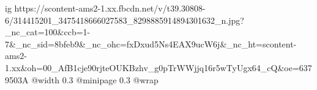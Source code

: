  
 
 
 
 

\ifcmt
  ig https://scontent-ams2-1.xx.fbcdn.net/v/t39.30808-6/314415201_3475418666027583_8298885914894301632_n.jpg?_nc_cat=100&ccb=1-7&_nc_sid=8bfeb9&_nc_ohc=fxDxud5Ns4EAX9ucW6j&_nc_ht=scontent-ams2-1.xx&oh=00_AfB1cje90rjteOUKBzhv_g0pTrWWjjq16r5wTyUgx64_cQ&oe=6379503A
  @width 0.3
  @minipage 0.3
  @wrap \parpic[r]
\fi

